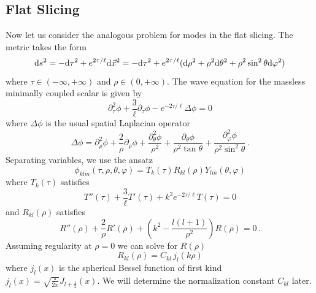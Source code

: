 \documentclass{brownthesis}
\def\dd{{\rm d}}
\begin{document}
\subsection{Flat Slicing}

Now let us consider the analogous problem for modes in the flat slicing.
The metric takes the form
\[
\dd s^{2}=-\dd\tau^{2}+e^{2\tau/\ell}\dd\vec{x}^{2}=-\dd\tau^{2}+e^{2\tau/\ell}(\dd\rho^{2}+\rho^{2}\dd\theta^{2}+\rho^{2}\sin^{2}\theta\dd\varphi^{2})
\]
where $\tau\in(-\infty,+\infty)$ and $\rho\in(0,+\infty)$. The wave
equation for the massless minimally coupled scalar is given by
\[
\partial_{\tau}^{2}\phi+\frac{3}{\ell}\partial_{\tau}\phi-e^{-2\tau/\ell}\Delta\phi=0
\]
where $\Delta\phi$ is the usual spatial Laplacian operator
\[
\Delta\phi=\partial_{\rho}^{2}\phi+\frac{2}{\rho}\partial_{\rho}\phi+\frac{\partial_{\theta}^{2}\phi}{\rho^{2}}+\frac{\partial_{\theta}\phi}{\rho^{2}\tan\theta}+\frac{\partial_{\varphi}^{2}\phi}{\rho^{2}\sin^{2}\theta}\,.
\]
Separating variables, we use the ansatz
\[
\phi_{klm}(\tau,\rho,\theta,\varphi)=T_{k}(\tau)R_{kl}(\rho)Y_{lm}(\theta,\varphi)
\]
where $T_{k}(\tau)$ satisfies
\[
T''(\tau)+\frac{3}{\ell}T'(\tau)+k^{2}e^{-2\tau/\ell}T(\tau)=0
\]
and $R_{kl}(\rho)$ satisfies
\[
R''(\rho)+\frac{2}{\rho}R'(\rho)+\left(k^{2}-\frac{l(l+1)}{\rho^{2}}\right)R(\rho)=0\,.
\]
Assuming regularity at $\rho=0$ we can solve for $R(\rho)$
\[
R_{kl}(\rho)=C_{kl}\,j_{l}(k\rho)
\]
where $j_{l}(x)$ is the spherical Bessel function of first kind $j_{l}(x)=\sqrt{\frac{\pi}{2x}}J_{l+\frac{1}{2}}(x)$.
We will determine the normalization constant $C_{kl}$ later.
\end{document}
